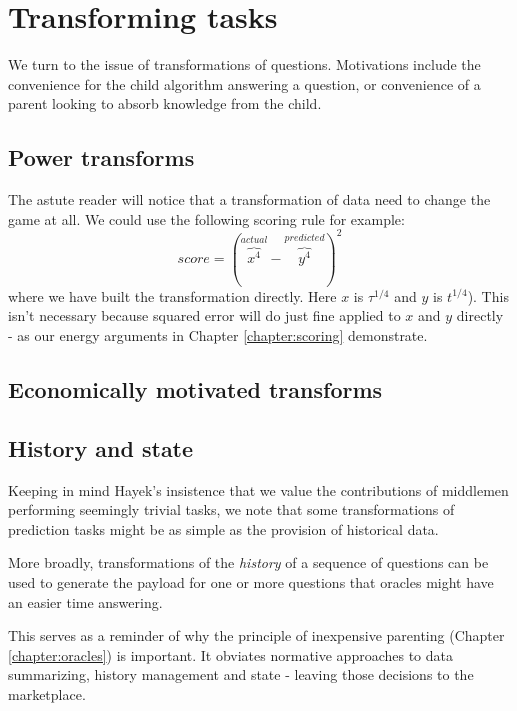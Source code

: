
\section{Transforming tasks}
\label{chapter:transforms}

We turn to the issue of transformations of questions. Motivations include the convenience for the child algorithm answering a question, or convenience of a parent looking to absorb knowledge from the child. 

\subsection{Power transforms}

The astute reader will notice that a transformation of data need to change the game at all. We could use the following scoring rule for example:
$$
    score = (\overbrace{x^{4}}^{actual} - \overbrace{y^{4}}^{predicted})^2 
$$
where we have built the transformation directly. Here $x$ is $\tau^{1/4}$ and $y$ is $t^{1/4}$). This isn't necessary because squared error will do just fine applied to $x$ and $y$ directly - as our energy arguments in Chapter \ref{chapter:scoring} demonstrate.  



\subsection{Economically motivated transforms}

\subsection{History and state}
\label{sec:history}

Keeping in mind Hayek's insistence that we value the contributions of middlemen performing seemingly trivial tasks, we note that some transformations of prediction tasks might be as simple as the provision of historical data. 

More broadly, transformations of the {\em history} of a sequence of questions can be used to generate the payload for one or more questions that oracles might have an easier time answering.

This serves as a reminder of why the principle of inexpensive parenting (Chapter \ref{chapter:oracles}) is important. It obviates normative approaches to data summarizing, history management and state - leaving those decisions to the marketplace. 

